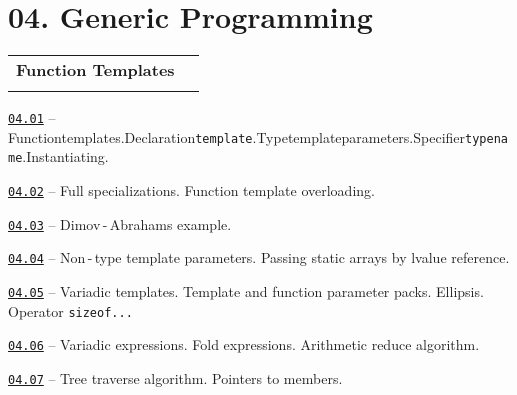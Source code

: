 \documentclass[a4paper,12pt]{article}
\renewenvironment{itemize}
{
    \begin{list}{\labelitemi}
    {
      \setlength{\topsep}{0pt}
      \setlength{\partopsep}{0pt}
      \setlength{\parskip}{0pt}
      \setlength{\itemsep}{0pt}
      \setlength{\parsep}{0pt}
      \setlength{\leftmargin}{14.5pt}
    }
}{\end{list}}
\begin{document}
\section{04. Generic Programming}

\begin{tabular}{!{\vrule width 1pt}L{3.9cm}!{\vrule width 1pt}L{15.1cm}!{\vrule width 0pt}} 


\textbf{Function Templates} & \\


\end{tabular}

\medskip\smallskip

\begin{itemize}

    \item \href{https://github.com/i-s-m-mipt/Education/blob/master/projects/examples/source/04.01.cpp}{\texttt{04.01}} -- Function\:templates.\:Declaration\:\lstinline{template}.\:Type\:template\:parameters.\:Specifier\:\lstinline{typename}.\:Instantiating.

    \smallskip

    \item \href{https://github.com/i-s-m-mipt/Education/blob/master/projects/examples/source/04.02.cpp}{\texttt{04.02}} -- Full specializations. Function template overloading.

    \smallskip

    \item \href{https://github.com/i-s-m-mipt/Education/blob/master/projects/examples/source/04.03.cpp}{\texttt{04.03}} -- Dimov\,-\,Abrahams example.

    \smallskip

    \item \href{https://github.com/i-s-m-mipt/Education/blob/master/projects/examples/source/04.04.cpp}{\texttt{04.04}} -- Non\,-\,type template parameters. Passing static arrays by lvalue reference.

    \smallskip

    \item \href{https://github.com/i-s-m-mipt/Education/blob/master/projects/examples/source/04.05.cpp}{\texttt{04.05}} -- Variadic templates. Template and function parameter packs. Ellipsis.  Operator \lstinline{sizeof...}

    \smallskip

    \item \href{https://github.com/i-s-m-mipt/Education/blob/master/projects/examples/source/04.06.cpp}{\texttt{04.06}} -- Variadic expressions. Fold expressions. Arithmetic reduce algorithm.

    \smallskip

    \item \href{https://github.com/i-s-m-mipt/Education/blob/master/projects/examples/source/04.07.cpp}{\texttt{04.07}} -- Tree traverse algorithm. Pointers to members.

\end{itemize}
\end{document}
